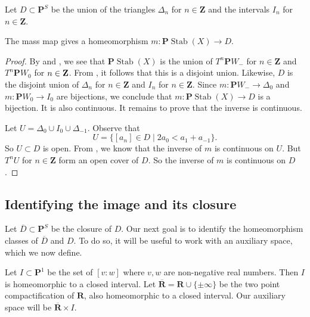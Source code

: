 \documentclass{amsart}
\begin{document}
Let \(D \subset \mathbf{P}^S\) be the union of the triangles \(\Delta_n\) for \(n \in \mathbf{Z}\) and the intervals \(I_n\) for \(n \in \mathbf{Z}\).
\begin{theorem}\label{thm:homeo}
  The mass map gives a homeomorphism \(m \colon \mathbf{P} \operatorname{Stab}(X) \to D\).
\end{theorem}
\begin{proof}
  By  and , we see that \(\mathbf{P}\operatorname{Stab}(X)\) is the union of \(T^n \mathbf{P}W_-\) for \(n \in \mathbf{Z}\) and \(T^n \mathbf{P} W_0\) for \(n \in {\bf Z}\).
  From , it follows that this is a disjoint union.
  Likewise, \(D\) is the disjoint union of \(\Delta_n\) for \(n \in \mathbf{Z}\) and \(I_n\) for \(n \in \mathbf{Z}\).
  Since \(m \colon \mathbf{P}W_- \to \Delta_0\) and \(m \colon \mathbf{P}W_0 \to I_0\) are bijections, we conclude that \(m \colon \mathbf{P} \operatorname{Stab}(X) \to D\) is a bijection.
  It is also continuous.
  It remains to prove that the inverse is continuous.

  Let \(U = \Delta_0 \cup I_0 \cup \Delta_{-1}\).
  Observe that
  \[ U = \{[a_n] \in D \mid 2a_0 < a_1 + a_{-1}\}.\]
  So \(U \subset D\) is open.
  From , we know that the inverse of \(m\) is continuous on \(U\).
  But \(T^n U\) for \(n \in \mathbf{Z}\) form an open cover of \(D\).
  So the inverse of \(m\) is continuous on \(D\).
\end{proof}

\subsection{Identifying the image and its closure}
Let \(\overline D \subset \mathbf{P}^S\) be the closure of \(D\).
Our next goal is to identify the homeomorphism classes of \(\overline D\) and \(D\).
To do so, it will be useful to work with an auxiliary space, which we now define.

Let \(I  \subset \mathbf{P}^{1}\) be the set of \([v:w]\) where \(v, w\) are non-negative real numbers.
Then \(I\) is homeomorphic to a closed interval.
Let \(\overline {\mathbf{R}} = \mathbf{R} \cup \{\pm \infty\}\) be the two point compactification of \(\mathbf{R}\), also homeomorphic to a closed interval.
Our auxiliary space will be \(\overline{\mathbf{R}} \times I\).
\end{document}
